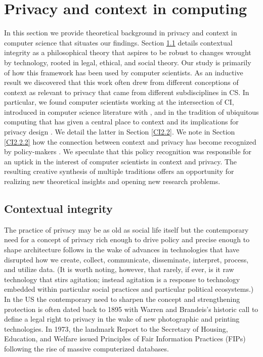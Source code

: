 \documentclass[../thesis.tex]{subfiles}
\begin{document}
\section{Privacy and context in computing}
\label{CI2}

In this section we provide theoretical
background in privacy and context in computer science that situates our
findings. Section \ref{CI2.1} details contextual integrity as a philosophical
theory that aspires to be robust to changes wrought by technology,
rooted in legal, ethical, and social theory. Our study is primarily of
how this framework has been used by computer scientists. As an
inductive result we discovered that this work often drew from different
conceptions of context as relevant to privacy that came from different
subdisciplines in CS. In particular, we found computer scientists
working at the intersection of CI, introduced in computer science
literature with \citet{barth06sp}, and in the tradition of ubiquitous
computing that has given a central place to context and its
implications for privacy design \citep{dey2001conceptual, dourish2004we}.
We detail the latter in Section \ref{CI2.2}.
We note in Section \ref{CI2.2.2} how the
connection between context and privacy has become recognized by
policy-makers \citep{house2012consumer, wef2012rethinking}. We
speculate that this policy recognition was responsible for an uptick in
the interest of computer scientists in context and
privacy. The resulting creative synthesis
of multiple traditions offers an opportunity for realizing new
theoretical insights and opening new research problems.

\subsection{Contextual integrity}
\label{CI2.1}

The practice of privacy may be as old as social life itself but the
contemporary need for a concept of privacy rich enough to drive policy
and precise enough to shape architecture follows in the wake of
advances in technologies that have disrupted how we create, collect,
communicate, disseminate, interpret, process, and utilize data. (It is
worth noting, however, that rarely, if ever, is it raw technology that
stirs agitation; instead agitation is a response to technology embedded
within particular social practices and particular political
ecosystems.)
In the US the contemporary need to sharpen the concept
and strengthening protection is often dated back to 1895 with Warren
and Brandeis's historic call to define a legal right to
privacy in the wake of new photographic and printing technologies. In
1973, the landmark Report to the Secretary of Housing, Education, and
Welfare issued Principles of Fair Information Practices (FIPs)
following the rise of massive computerized databases. 
\end{document}
